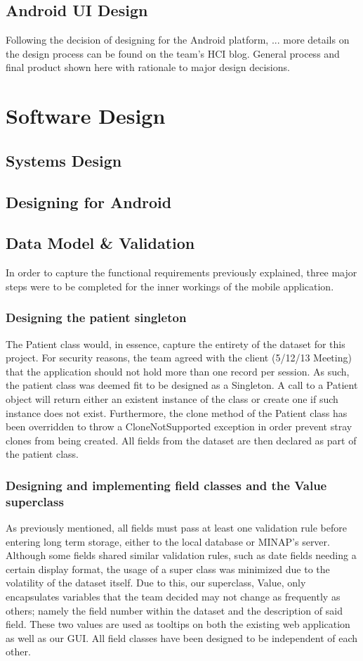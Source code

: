 \documentclass[12pt,a4paper,oneside,titlepage]{article}
\begin{document}
\subsection{Android UI Design}
Following the decision of designing for the Android platform,  ... more details on the design process can be found on the team's HCI blog.  General process and final product shown here with rationale to major design decisions.

\newpage
\section{Software Design}
\subsection{Systems Design}
\subsection{Designing for Android}
\subsection{Data Model \& Validation}
In order to capture the functional requirements previously explained, three major steps were to be completed for the inner workings of the mobile application.

\subsubsection{Designing the patient singleton}
The Patient class would, in essence, capture the entirety of the dataset for this project. For security reasons, the team agreed with the client (5/12/13 Meeting) that the application should not hold more than one record per session. As such, the patient class was deemed fit to be designed as a Singleton. A call to a Patient object will return either an existent instance of the class or create one if such instance does not exist. Furthermore, the clone method of the Patient class has been overridden to throw a CloneNotSupported exception in order prevent stray clones from being created. All fields from the dataset are then declared as part of the patient class.

\subsubsection{Designing and implementing field classes and the Value superclass}
As previously mentioned, all fields must pass at least one validation rule before entering long term storage, either to the local database or MINAP's server. Although some fields shared similar validation rules, such as date fields needing a certain display format, the usage of a super class was minimized due to the volatility of the dataset itself. Due to this, our superclass, Value, only encapsulates variables that the team decided may not change as frequently as others; namely the field number within the dataset and the description of said field. These two values are used as tooltips on both the existing web application as well as our GUI. All field classes have been designed to be independent of each other.
\end{document}
